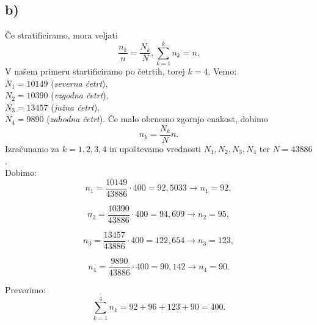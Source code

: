 \documentclass{article}
\begin{document}
\subsection*{b)}

Če stratificiramo, mora veljati 
\begin{equation*}
\frac{n_k}{n} = \frac{N_k}{N},   \sum_{k=1}^k n_k = n .
\end{equation*}
V našem primeru startificiramo po četrtih, torej $k=4$.
Vemo:\\
$N_1 = 10 149$ (\textit{severna četrt}),\\
$N_2 = 10 390$ (\textit{vzgodna četrt}),\\
$N_3 = 13 457$ (\textit{južna četrt}),\\
$N_4 = 9 890$ (\textit{zahodna četrt}).
Če malo obrnemo zgornjo enakost, dobimo
\begin{equation*}
n_k = \frac{N_k}{N} n.
\end{equation*}
Izračunamo za $k = 1,2,3,4$ in upoštevamo vrednosti $N_1,N_2,N_3,N_4$ ter $N = 43886$.\\
Dobimo:
\begin{equation*}
n_1 = \frac{10149}{43886} \cdot 400 = 92,5033 \rightarrow n_1 = 92,
\end{equation*}

\begin{equation*}
n_2 = \frac{10390}{43886} \cdot 400 = 94, 699 \rightarrow n_2 = 95,
\end{equation*}

\begin{equation*}
n_3 = \frac{13457}{43886} \cdot 400 = 122,654 \rightarrow n_3 = 123,
\end{equation*}

\begin{equation*}
n_4 = \frac{9890}{43886} \cdot 400 = 90,142 \rightarrow n_4 = 90.
\end{equation*}

Preverimo:
\begin{equation*}
\sum_{k=1}^{4}n_k = 92+96+123+90 = 400.
\end{equation*}
\end{document}
